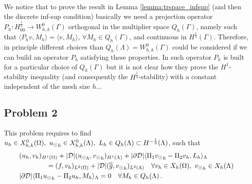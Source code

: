 \begin{remark} We notice that to prove the result in Lemma \ref{lemma:trspace_infsup} (and then the discrete inf-sup condition)  basically we need a projection operator $P_h: H^{\frac 12}_{00} \longrightarrow W_{h,k}^0(\Gamma)$ orthogonal in the multiplier space $Q_h(\Gamma)$, namely such that $\langle P_h v, M_h \rangle = \langle v, M_h \rangle, \, \forall M_h \in Q_h(\Gamma)$, and continuous in $H^{\frac 12}(\Gamma)$. Therefore, in principle different choices than $Q_h(\Lambda)=W_{h,k}^0(\Gamma)$ could be considered if we can build an operator $P_h$ satisfying these properties. In \cite{belgacem1999mortar} such operator $P_h$  is built for a particular choice of $Q_h(\Gamma)$ but it is not clear how they prove the $H^1$-stability inequality (and consequently the $H^{\frac 12 }$-stability) with a constant independent of the mesh size $h$...
\end{remark}  
\subsection{Problem 2}
This problem requires to find  $u_h \in X^0_{h,k}(\Omega) ,\ {u_{\odot}}_h \in X^0_{h,k}(\Lambda), \ L_h \in Q_h(\Lambda) \subset H^{-\frac12}(\Lambda)$, such that
\begin{subequations}
\begin{align*}
&(u_h,v_h)_{H^1(\Omega)} + |{\cal D}|({\ud}_h,{\vd}_h)_{H^1(\Lambda)} 
+ |\partial {\cal D}| \langle  \Pi_1 {\vd}_h - \Pi_2 v_h, L_h \rangle_\Lambda 
\\
\nonumber
&\qquad\qquad= (f,v_h)_{L^2(\Omega)} + |{\cal D}| (\avrd{g},{\vd}_h)_{L^2(\Lambda)}
\quad \forall v_h \in X_h(\Omega), \ {\vd}_h \in X_h(\Lambda)
\\
&  |\partial {\cal D}| \langle \Pi_1 {\ud}_h - \Pi_2 u_h, M_h \rangle_\Lambda = 0
\quad \forall M_h \in Q_h(\Lambda)\,.
\end{align*}
\end{subequations}

